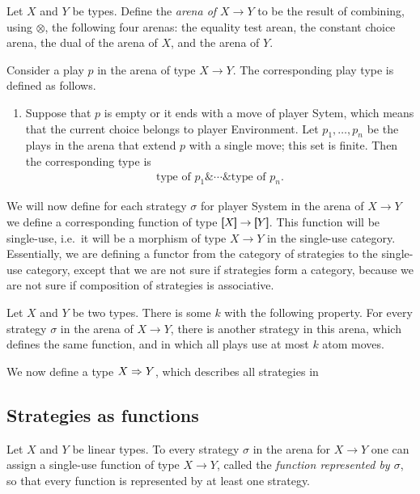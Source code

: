 \begin{definition}
    Let $X$ and $Y$ be types. 
    Define the \emph{arena of $X \to Y$} to be the result of combining, using $\otimes$, the following four arenas: the equality test arean, the constant choice arena, the dual of the arena of $X$, and the arena of $Y$.
\end{definition}






Consider a play $p$ in the arena of type $X \to Y$. The corresponding play type is defined as follows.
\begin{enumerate}
    \item Suppose that $p$ is empty or it ends with a move of player Sytem, which means that the current choice belongs to player Environment. Let $p_1,\ldots,p_n$ be the plays in the arena that extend $p$ with a single move; this set is finite. Then the corresponding type  is 
    \begin{align*}
    \text{type of $p_1$} \& \cdots \& \text{type of $p_n$}.
    \end{align*}
\end{enumerate}

We will now define for each strategy $\sigma$ for player System in the arena of $X \to Y$ we define a corresponding function of type  $\sem X \to \sem Y$. This function will be single-use, i.e.~it will be a morphism of type $X \to Y$ in the single-use category. Essentially, we are defining a functor from the category of strategies to the single-use category, except that we are not sure if strategies form a category, because we are not sure if composition of strategies is associative.


\begin{lemma}
    Let $X$ and $Y$ be two types. There is some $k$ with the following property. For every strategy $\sigma$ in the arena of $X \to Y$, there is another strategy in this arena, which defines the same function, and in which all plays use at most $k$ atom moves.
\end{lemma}

We now define a type $X \Rightarrow Y$, which describes all strategies in 

\subsection{Strategies as functions}

\begin{lemma}
    Let $X$ and $Y$ be linear types. To every strategy $\sigma$ in the arena for $X \to Y$  one can assign a single-use function of type $X \to Y$, called the \emph{function represented by $\sigma$}, so that every function is represented by at least one strategy.
\end{lemma}




